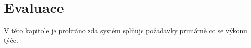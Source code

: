 
\chapter{Evaluace}

V této kapitole je probráno zda systém splňuje požadavky primárně co se výkonu týče.


